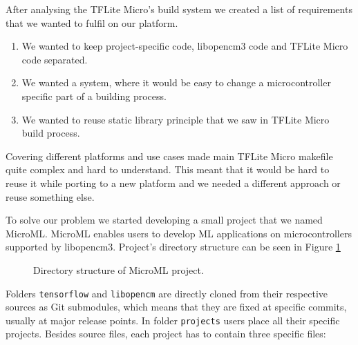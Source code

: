 After analysing the TFLite Micro's build system we created a list of requirements that we wanted to fulfil on our platform.

\begin{enumerate}
    \item We wanted to keep project-specific code, libopencm3 code and TFLite Micro code separated.
    \item We wanted a system, where it would be easy to change a microcontroller specific part of a building process.
    \item We wanted to reuse static library principle that we saw in TFLite Micro build process.
\end{enumerate}

Covering different platforms and use cases made main TFLite Micro makefile quite complex and hard to understand.
This meant that it would be hard to reuse it while porting to a new platform and we needed a different approach or reuse something else.

To solve our problem we started developing a small project that we named MicroML\footnotemark.
MicroML enables users to develop ML applications on microcontrollers supported by libopencm3.
Project's directory structure can be seen in Figure \ref{microml_dir}


\begin{figure}[ht] 
    \centering
    \begin{minipage}{7cm}
    \end{minipage}
    \caption{ Directory structure of MicroML project.}
    \label{microml_dir}
\end{figure}

Folders \verb|tensorflow| and \verb|libopencm| are directly cloned from their respective sources as Git submodules, which means that they are fixed at specific commits, usually at major release points.
In folder \verb|projects| users place all their specific projects.
Besides source files, each project has to contain three specific files:


